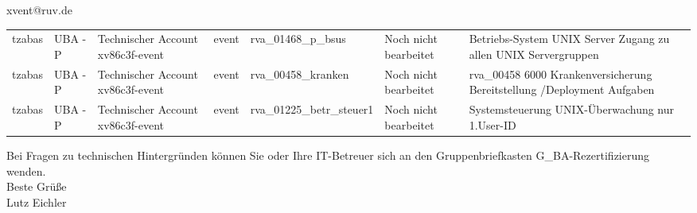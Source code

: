 \documentclass[a4paper,landscape,12pt]{letter}
\begin{document}
\begin{letter}{xvent@ruv.de\hfill \break}
\begin{tiny}
\begin{longtable}{|p{35mm}|p{15mm}|p{25mm}|p{10mm}|p{40mm}|p{50mm}|p{50mm}|}
tzabas & UBA - P & Technischer Account xv86c3f-event & event & rva\_01468\_p\_bsus & Noch nicht bearbeitet & Betriebs-System UNIX Server Zugang zu allen UNIX Servergruppen \\
tzabas & UBA - P & Technischer Account xv86c3f-event & event & rva\_00458\_kranken & Noch nicht bearbeitet & rva\_00458 6000 Krankenversicherung Bereitstellung /Deployment Aufgaben \\
tzabas & UBA - P & Technischer Account xv86c3f-event & event & rva\_01225\_betr\_steuer1 & Noch nicht bearbeitet & Systemsteuerung UNIX-Überwachung nur 1.User-ID \\

\hline
		\end{longtable}
		\end{tiny}
	
\begin{minipage}{\textwidth}
			Bei Fragen zu technischen Hintergründen können Sie 
			oder Ihre IT-Betreuer sich an den Gruppenbriefkasten 
			G\_BA-Rezertifizierung
			wenden.\\
			\linebreak
			Beste Grüße\\
			Lutz Eichler
	\end{minipage}
	\end{letter}
	
\end{document}
